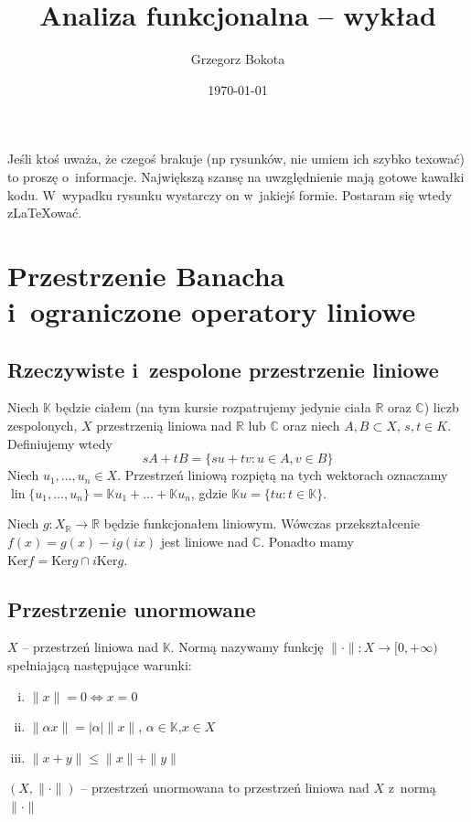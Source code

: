 \documentclass[11pt]{mwrep}
\title{Analiza funkcjonalna  -- wykład}
\author{Grzegorz Bokota}
\date{\today}
\renewcommand{\[}{\begin{equation}}
\renewcommand{\]}{\end{equation}}
\newcommand{\C}{{\ensuremath{\mathbb C}}}
\newcommand{\R}{{\ensuremath{\mathbb R}}}
\newcommand{\K}{\ensuremath{\mathbb{K}}}
\newcommand{\lin}{\operatorname{lin}}
\newcounter{numer}
\begin{document}
\setlength{\headheight}{15pt}
\pagestyle{fancy}
\maketitle
\tableofcontents
{}
Jeśli ktoś uważa, że czegoś brakuje (np rysunków, nie umiem ich szybko texować) to proszę o~informacje. 
Największą szansę na uwzględnienie mają gotowe kawałki kodu. W~wypadku rysunku wystarczy on w~jakiejś formie. Postaram się wtedy z\LaTeX ować.
\chapter{Przestrzenie Banacha i~ograniczone operatory liniowe}
\section{Rzeczywiste i~zespolone przestrzenie liniowe}
Niech $\K$ będzie ciałem (na tym kursie rozpatrujemy jedynie ciała $\R$ oraz $\C$) liczb zespolonych,
$X$ przestrzenią liniowa nad $\R$ lub $\C$ oraz niech $A,B \subset  X$, $s,t \in K$. Definiujemy wtedy
$$sA+tB = \{su + tv\colon u \in A, v\in B\}$$
Niech $u_1,\ldots ,u_n \in X $. Przestrzeń liniową rozpiętą na tych wektorach oznaczamy $\lin\{u_1,\ldots, u_n\} = \K u_1 + \ldots + \K u_n $, gdzie $\K u = \{ t u\colon t \in \K\}$. 

Niech $g: X_\R \to \R $ będzie funkcjonałem liniowym. Wówczas przekształcenie $f(x) =g(x) - ig(ix)$ jest liniowe nad $\C$. Ponadto mamy $\textrm{Ker}f = \textrm{Ker} g \cap i \textrm{Ker}g$.

\section{Przestrzenie unormowane}
$X$ -- przestrzeń liniowa nad $\K$. Normą nazywamy funkcję  $\|\cdot \|\colon X \to [0, +\infty )$ spełniającą następujące warunki:
	\begin{enumerate}[i.]
	\item $\|x\| = 0 \Leftrightarrow x=0$ 
	\item $\|\alpha x \| = |\alpha| \| x\|$, $\alpha \in \K$,$x\in X$ 
	\item $\|x+y\| \le \|x\| + \|y\|$  
\end{enumerate}
$(X,\|\cdot\|)$ -- przestrzeń unormowana to przestrzeń liniowa nad $X$ z~normą $\|\cdot\|$\\
\end{document}
